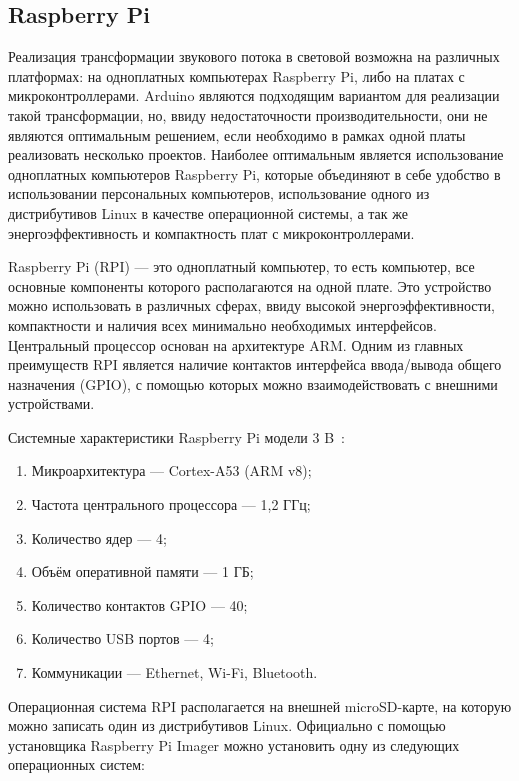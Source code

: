 \subsection{Raspberry Pi}

Реализация трансформации звукового потока в световой возможна на различных платформах: на одноплатных компьютерах Raspberry Pi, либо на платах с микроконтроллерами. Arduino являются подходящим вариантом для реализации такой трансформации, но, ввиду недостаточности производительности, они не являются оптимальным решением, если необходимо в рамках одной платы реализовать несколько проектов. Наиболее оптимальным является использование одноплатных компьютеров Raspberry Pi, которые объединяют в себе удобство в использовании персональных компьютеров, использование одного из дистрибутивов Linux в качестве операционной системы, а так же энергоэффективность и компактность плат с микроконтроллерами.

Raspberry Pi (RPI) --- это одноплатный компьютер, то есть компьютер, все основные компоненты которого располагаются на одной плате. Это устройство можно использовать в различных сферах, ввиду высокой энергоэффективности, компактности и наличия всех минимально необходимых интерфейсов. Центральный процессор основан на архитектуре ARM. Одним из главных преимуществ RPI является наличие контактов интерфейса ввода/вывода общего назначения (GPIO), с помощью которых можно взаимодействовать с внешними устройствами.

Системные характеристики Raspberry Pi модели 3 B~\cite{rpi-site}:

\begin{enumerate}
  \item Микроархитектура --- Cortex-A53 (ARM v8);
  \item Частота центрального процессора --- 1,2 ГГц;
  \item Количество ядер --- 4;
  \item Объём оперативной памяти --- 1 ГБ;
  \item Количество контактов GPIO --- 40;
  \item Количество USB портов --- 4;
  \item Коммуникации --- Ethernet, Wi-Fi, Bluetooth.
\end{enumerate}

Операционная система RPI располагается на внешней microSD-карте, на которую можно записать один из дистрибутивов Linux. Официально с помощью установщика Raspberry Pi Imager можно установить одну из следующих операционных систем:

